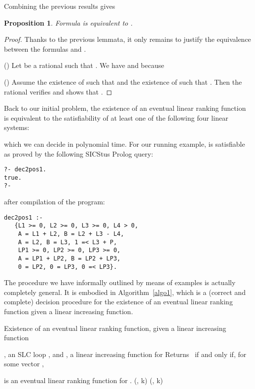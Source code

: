 \documentclass{acm_proc_article-sp}
\newtheorem{proposition}[theorem]{Proposition}
\newcommand{\dec}{\mathrm{DEC}}
\newcommand{\pos}{\mathrm{POS}}
\begin{document}
Combining the previous results gives
\begin{proposition}
Formula  is equivalent to
.
\end{proposition}

\begin{proof}
Thanks to the previous lemmata, it only remains to justify the equivalence
between the formulas 
and .

() Let  be a rational such that .
We have  and  because


() Assume the existence of 
such that   and the existence of 
such that .
Then the rational 
verifies 
and shows that .
\end{proof}

Back to our initial problem, the existence of an eventual linear
ranking function is equivalent to the satisfiability of at least one
of the following four linear systems:

which we can decide in polynomial time.
For our running example,
 is satisfiable
as proved by the following SICStus Prolog query:
\begin{verbatim}
?- dec2pos1.
true.
?-
\end{verbatim}
after compilation of the program:
\begin{verbatim}
dec2pos1 :-
   {L1 >= 0, L2 >= 0, L3 >= 0, L4 > 0,
    A = L1 + L2, B = L2 + L3 - L4,
    A = L2, B = L3, 1 =< L3 + P,
    LP1 >= 0, LP2 >= 0, LP3 >= 0,
    A = LP1 + LP2, B = LP2 + LP3,
    0 = LP2, 0 = LP3, 0 =< LP3}.
\end{verbatim}

The procedure we have informally outlined by means of examples is
actually completely general.
It is embodied in Algorithm~\ref{algo1}, which is a (correct and
complete) decision procedure for the existence of an eventual
linear ranking function given a linear increasing function.

\begin{algorithm}
\caption{Existence of an eventual linear ranking function, given a linear increasing function}
\label{algo1}
\begin{algorithmic}[1]
\REQUIRE
, an SLC loop
,
and , a linear increasing function for 
\ENSURE
Returns \TRUE\ if and only if, for some vector ,

is an eventual linear ranking function for .
\STATE
\rho
\STATE
\dec(, k)
\STATE
\rho
\STATE
\pos(, k)
  \RETURN \TRUE
\ELSE
  \RETURN \FALSE
\ENDIF
\end{algorithmic}
\end{algorithm}
\end{document}

